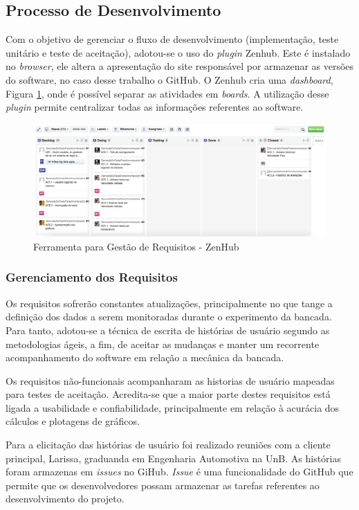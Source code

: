 \subsection{Processo de Desenvolvimento}

	Com o objetivo de gerenciar o fluxo de desenvolvimento (implementação, teste unitário e teste de aceitação), adotou-se o uso do \textit{plugin} Zenhub. Este é instalado no \textit{browser}, ele altera a apresentação do site responsável por armazenar as versões do software, no caso desse trabalho o GitHub. O Zenhub cria uma \textit{dashboard}, Figura \ref{img:zenHub},  onde é possível separar as atividades em \textit{boards}. A utilização desse \textit{plugin} permite centralizar todas as informações referentes ao software.

	\begin{figure}[h]
		\centering
		\includegraphics[width=1\textwidth]{resource/zenHub.png}
		\caption{Ferramenta para Gestão de Requisitos - ZenHub}
		\label{img:zenHub}
	\end{figure}


\subsubsection{Gerenciamento dos Requisitos}

	Os requisitos sofrerão constantes atualizações, principalmente no que tange a definição dos dados a serem monitoradas durante o experimento da bancada. Para tanto, adotou-se a técnica de escrita de histórias de usuário segundo as metodologias ágeis, a fim, de aceitar as mudanças e manter um recorrente acompanhamento do software em relação a mecânica da bancada.

	Os requisitos não-funcionais acompanharam as historias de usuário mapeadas para testes de aceitação. Acredita-se que a maior parte destes requisitos está ligada a usabilidade e confiabilidade, principalmente em relação à acurácia dos cálculos e plotagens de gráficos.

	Para a elicitação das histórias de usuário foi realizado reuniões com a cliente principal, Larissa, graduanda em Engenharia Automotiva na UnB. As histórias foram armazenas em \textit{issues} no GiHub. \textit{Issue} é uma funcionalidade do GitHub que permite que os desenvolvedores possam armazenar as tarefas referentes ao desenvolvimento do projeto.

